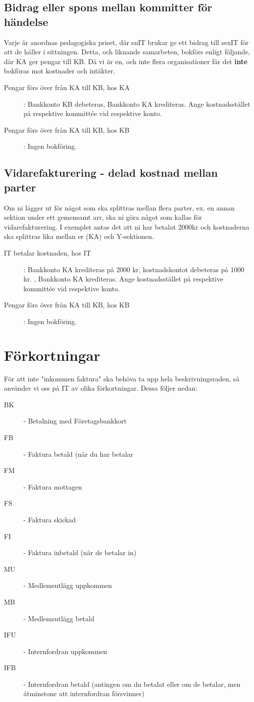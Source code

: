 \documentclass{article}
\begin{document}
\subsection{Bidrag eller spons mellan kommitter för händelse}
Varje år anordnas pedagogiska priset, där snIT brukar ge ett bidrag till sexIT för att de håller i sittningen. Detta, och liknande samarbeten, bokförs enligt följande, där KA ger pengar till KB. Då vi är en, och inte flera organisationer får det \textbf{inte} bokföras mot kostnader och intäkter.  
\begin{description}
    \item [Pengar förs över från KA till KB, hos KA]: Bankkonto KB debeteras, Bankkonto KA krediteras. Ange kostnadsstället på respektive kommittée vid respektive konto.
    \item [Pengar förs över från KA till KB, hos KB]: Ingen bokföring. 
\end{description}

\subsection{Vidarefakturering - delad kostnad mellan parter}
Om ni lägger ut för något som ska splittras mellan flera parter, ex. en annan sektion under ett gemensamt arr, ska ni göra något som kallas för vidarefakturering. I exemplet antas det att ni har betalat 2000kr och kostnaderna ska splittras lika mellan er (KA) och Y-sektionen. 
\begin{description}
    \item [IT betalar kostnaden, hos IT]: Bankkonto KA krediteras på 2000 kr, kostnadskontot debeteras på 1000 kr. , Bankkonto KA krediteras. Ange kostnadsstället på respektive kommittée vid respektive konto.
    \item [Pengar förs över från KA till KB, hos KB]: Ingen bokföring. 
\end{description}

\section{Förkortningar}
För att inte "inkommen faktura" ska behöva ta upp hela beskrivningsraden, så använder vi oss på IT av olika förkortningar. Dessa följer nedan: 
\begin{description}
    \item[BK] - Betalning med Företagsbankkort
    \item[FB] - Faktura betald (när du har betalar 
    \item[FM] - Faktura mottagen
    \item[FS] - Faktura skickad
    \item[FI] - Faktura inbetald (när de betalar in)
    \item[MU] - Medlemsutlägg uppkommen
    \item[MB] - Medlemsutlägg betald
    \item[IFU] - Internfordran uppkommen
    \item[IFB] - Internfordran betald (antingen om du betalat eller om de betalar, men åtminstone att internfordran försvinner)

\end{description}
\end{document}
